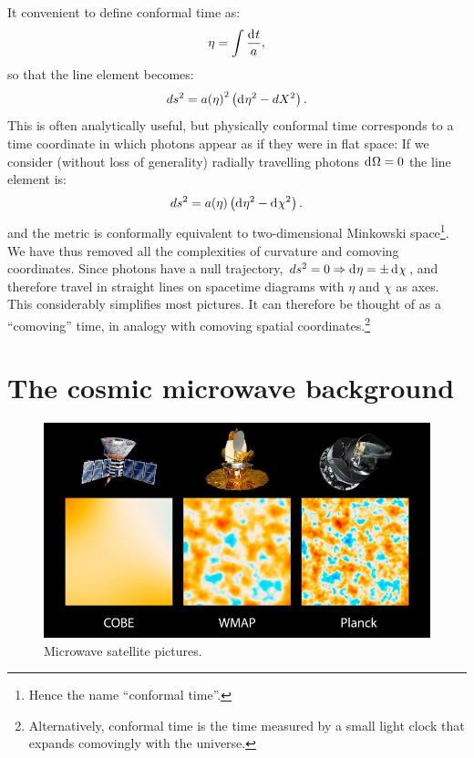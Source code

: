 It convenient to define conformal time as:
\begin{equation}
  \eta = \int \frac{\operatorname{d}^{}\!{t}}{a},
  \label{eqn:cos:conformal_time}
\end{equation}
so that the line element becomes:
\begin{equation}          
  ds^2 = {a(\eta)}^2\left( \operatorname{d}^{}\!{\eta}^2 - d{X}^2 \right).
  \label{eqn:cos:flat_FRW}
\end{equation}
This is often analytically useful, but physically conformal time corresponds to a time coordinate in which photons appear as if they were in flat space: If we consider (without loss of generality) radially travelling photons $\operatorname{d}^{}\!{\Omega}=0$ the line element is:
\begin{equation}          
  ds^2 = a(\eta)\left( \operatorname{d}^{}\!{\eta}^2 - \operatorname{d}^{}\!{\chi}^2 \right).
  \label{eqn:cos:flat_FRW_radial}
\end{equation}
and the metric is conformally equivalent to two-dimensional Minkowski space\footnote{Hence the name ``conformal time''.}. We have thus removed all the complexities of curvature and comoving coordinates. Since photons have a null trajectory, $ds^2=0\Rightarrow \operatorname{d}^{}\!{\eta} = \pm \operatorname{d}^{}\!{\chi}$, and therefore  travel in straight lines on spacetime diagrams with $\eta$ and $\chi$ as axes. This considerably simplifies most pictures. It can therefore be thought of as a ``comoving'' time, in analogy with comoving spatial coordinates.\footnote{Alternatively, conformal time is the time measured by a small light clock that expands comovingly with the universe.}

\section{The cosmic microwave background}
\begin{figure}[tp]
  \centering
  \includegraphics[width=\textwidth]{chapters/inflationary_cosmology/figures/satellites}
  \caption{Microwave satellite pictures.}\label{fig:cos:satellites}
\end{figure}

